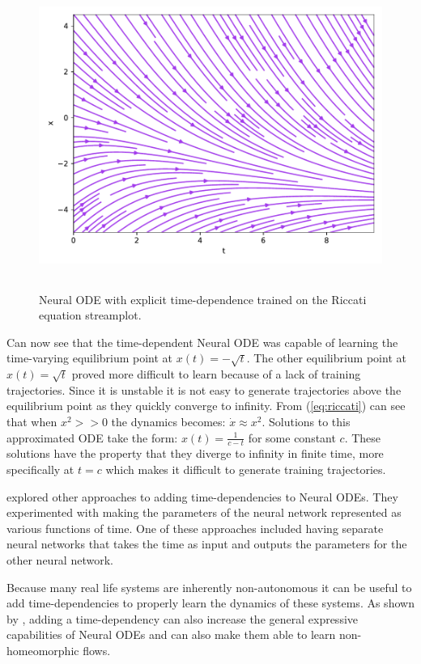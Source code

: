\documentclass[12pt,a4paper]{book}
\begin{document}
\begin{figure}[H]
    \centering
    \includegraphics[height=10cm]{figs/riccati_nodetime.pdf}
    \caption{Neural ODE with explicit time-dependence trained on the Riccati equation streamplot.}
    \label{fig:riccati_nodetime}
\end{figure}

Can now see that the time-dependent Neural ODE was capable of learning the time-varying equilibrium point at $x(t) = - \sqrt{t}$. The other equilibrium point at $x(t) = \sqrt{t}$ proved more difficult to learn because of a lack of training trajectories. Since it is unstable it is not easy to generate trajectories above the equilibrium point as they quickly converge to infinity. From (\ref{eq:riccati}) can see that when $x^2 >> 0$ the dynamics becomes: $\dot{x} \approx x^2$. Solutions to this approximated ODE take the form: $x(t) = \frac{1}{c - t}$ for some constant $c$. These solutions have the property that they diverge to infinity in finite time, more specifically at $t = c$ which makes it difficult to generate training trajectories.

\cite{timedependencenode} explored other approaches to adding time-dependencies to Neural ODEs. They experimented with making the parameters of the neural network represented as various functions of time. One of these approaches included having separate neural networks that takes the time as input and outputs the parameters for the other neural network.

Because many real life systems are inherently non-autonomous it can be useful to add time-dependencies to properly learn the dynamics of these systems. As shown by \cite{timedependencenode}, adding a time-dependency can also increase the general expressive capabilities of Neural ODEs and can also make them able to learn non-homeomorphic flows.
\end{document}
